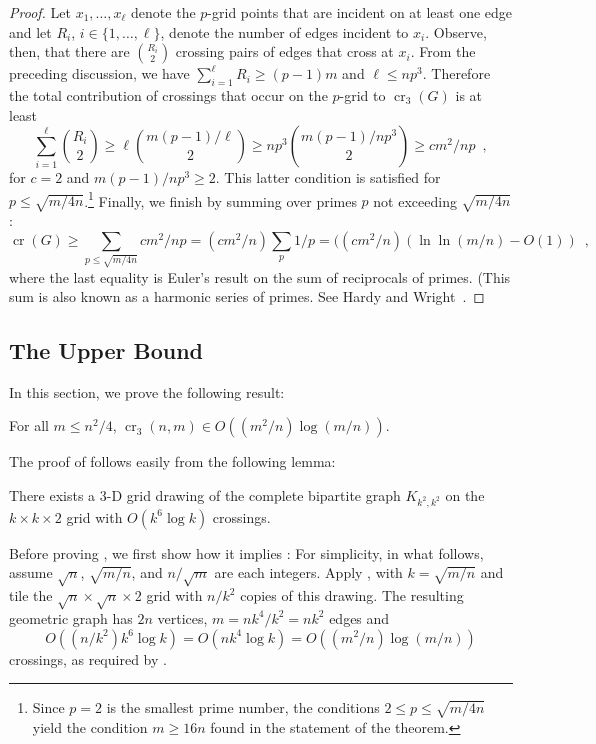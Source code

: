 \documentclass{patmorin}
\DeclareMathOperator{\crs}{cr}
\begin{document}
\begin{proof}
  Let $x_1,\ldots,x_\ell$ denote the $p$-grid points that are incident
  on at least one edge and let $R_i$, $i\in\{1,\ldots,\ell\}$, denote
  the number of edges incident to $x_i$.  Observe, then, that there
  are $\binom{R_i}{2}$ crossing pairs of edges that cross at $x_i$.
  From the preceding discussion, we have $\sum_{i=1}^\ell R_i \ge (p-1)m$
  and $\ell\le np^3$.  Therefore the total contribution of crossings
  that occur on the $p$-grid to $\crs_3(G)$ is at least
  \[
      \sum_{i=1}^\ell\binom{R_i}{2} \ge \ell \binom{m(p-1)/\ell}{2}
      \ge np^3\binom{m(p-1)/np^3}{2} \ge cm^2/np \enspace ,
  \]
  for $c=2$ and $m(p-1)/np^3 \ge 2$.  This latter condition is satisfied
  for $p \le \sqrt{m/4n}$.\footnote{Since $p=2$ is the smallest prime
  number, the conditions $2\le p\le\sqrt{m/4n}$ yield the
  condition $m\ge 16n$ found in the statement of the theorem.} Finally,
  we finish by summing over primes $p$ not exceeding $\sqrt{m/4n}$:
  \[
     \crs(G) \ge \sum_{p\le \sqrt{m/4n}} cm^2/np 
             = (cm^2/n) \sum_p 1/p 
             = ((cm^2/n)(\ln\ln(m/n)-O(1)) \enspace ,
  \]
  where the last equality is Euler's result on the sum of reciprocals
  of primes. (This sum is also known as a harmonic series of primes.
  See Hardy and Wright~\cite[Section~22.7]{hardy.wright:introduction}.
\end{proof}

\subsection{The Upper Bound}

In this section, we prove the following result:

\begin{thm}
  For all $m\le n^2/4$, $\crs_3(n,m) \in O((m^2/n)\log (m/n))$.
\end{thm}

The proof of  follows easily from the following
lemma:
\begin{lem}
  There exists a 3-D grid drawing of the complete bipartite graph
  $K_{k^2,k^2}$ on the $k\times k\times 2$ grid with $O(k^6\log k)$
  crossings.
\end{lem}

Before proving , we first show how it implies
: For simplicity, in what follows, assume
$\sqrt{n}$, $\sqrt{m/n}$, and $n/\sqrt{m}$ are each integers.
Apply , with $k=\sqrt{m/n}$ and tile the
$\sqrt{n}\times\sqrt{n}\times 2$ grid with $n/k^2$ copies of
this drawing. The resulting geometric graph has $2n$ vertices,
$m=nk^4/k^2=nk^2$ edges and
\[ 
   O((n/k^2)k^6\log k) = O(nk^4\log k) = O((m^2/n)\log(m/n))
\] 
crossings, as required by .
\end{document}
